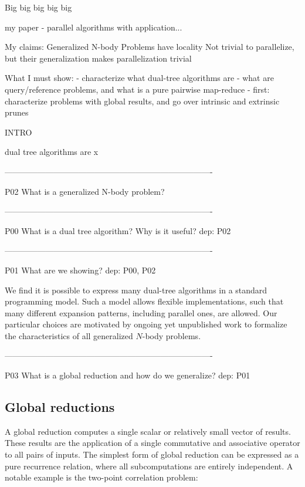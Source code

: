 
Big big big big big

my paper - parallel algorithms with application...


My claims:
  Generalized N-body Problems have locality
  Not trivial to parallelize, but their generalization makes parallelization
     trivial

What I must show:
 - characterize what dual-tree algorithms are
 - what are query/reference problems, and what is a pure pairwise map-reduce
 - first: characterize problems with global results, and go over intrinsic
 and extrinsic prunes


INTRO

  dual tree algorithms are x


----------------------------------------------------------------------------

P02 What is a generalized N-body problem?

----------------------------------------------------------------------------

P00 What is a dual tree algorithm?  Why is it useful?
dep: P02

----------------------------------------------------------------------------

P01 What are we showing?
dep: P00, P02

We find it is possible to express many dual-tree algorithms in a standard programming model.
Such a model allows flexible implementations, such that many different expansion patterns, including parallel ones, are allowed.
Our particular choices are motivated by ongoing yet unpublished work to formalize the characteristics of all generalized $N$-body problems.

----------------------------------------------------------------------------

P03 What is a global reduction and how do we generalize?
dep: P01

\subsection{Global reductions}

A global reduction computes a single scalar or relatively small vector of results.
These results are the application of a single commutative and associative operator to all pairs of inputs.
The simplest form of global reduction can be expressed as a pure recurrence relation, where all subcomputations are entirely independent.
A notable example is the two-point correlation problem:

